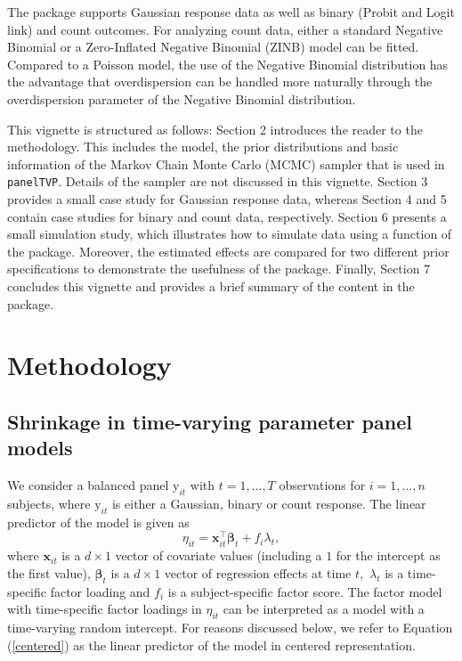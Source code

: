 \documentclass[a4paper, preprint, 3p,
authoryear]{elsarticle} %
\begin{document}
The package supports Gaussian response data as well as binary (Probit
and Logit link) and count outcomes. For analyzing count data, either a
standard Negative Binomial or a Zero-Inflated Negative Binomial (ZINB)
model can be fitted. Compared to a Poisson model, the use of the
Negative Binomial distribution has the advantage that overdispersion can
be handled more naturally through the overdispersion parameter of the
Negative Binomial distribution.

This vignette is structured as follows: Section 2 introduces the reader
to the methodology. This includes the model, the prior distributions and
basic information of the Markov Chain Monte Carlo (MCMC) sampler that is
used in \texttt{panelTVP}. Details of the sampler are not discussed in
this vignette. Section 3 provides a small case study for Gaussian
response data, whereas Section 4 and 5 contain case studies for binary
and count data, respectively. Section 6 presents a small simulation
study, which illustrates how to simulate data using a function of the
package. Moreover, the estimated effects are compared for two different
prior specifications to demonstrate the usefulness of the package.
Finally, Section 7 concludes this vignette and provides a brief summary
of the content in the package.

\section{Methodology}\label{methodology}

\subsection{Shrinkage in time-varying parameter panel
models}\label{shrinkage-in-time-varying-parameter-panel-models}

We consider a balanced panel \(\text{y}_{it}\) with \(t = 1,\dots,T\)
observations for \(i = 1,\dots,n\) subjects, where \(\text{y}_{it}\) is
either a Gaussian, binary or count response. The linear predictor of the
model is given as \begin{equation}
\label{centered}
    \eta_{it} = \textbf{x}_{it}^\top \boldsymbol{\beta}_t + f_i\lambda_t,
\end{equation} where \(\textbf{x}_{it}\) is a \(d \times 1\) vector of
covariate values (including a \(1\) for the intercept as the first
value), \(\boldsymbol{\beta}_t\) is a \(d \times 1\) vector of
regression effects at time \(t,\) \(\lambda_t\) is a time-specific
factor loading and \(f_i\) is a subject-specific factor score. The
factor model with time-specific factor loadings in \(\eta_{it}\) can be
interpreted as a model with a time-varying random intercept. For reasons
discussed below, we refer to Equation (\ref{centered}) as the linear
predictor of the model in centered representation.
\end{document}
